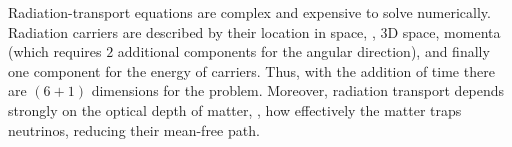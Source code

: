Radiation-transport equations are complex and expensive to solve numerically. 
Radiation carriers are described by their location in space, \ie, $3$D space, 
momenta (which requires $2$ additional components for the angular direction), and finally one 
component for the energy of carriers. 
%
Thus, with the addition of time there are $(6+1)$ dimensions for the problem. 
Moreover, radiation transport depends strongly on the optical depth of matter, 
\ie, how effectively the matter traps neutrinos, reducing their mean-free path.
%
%



